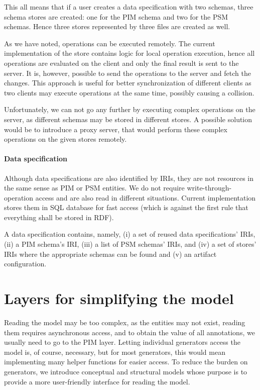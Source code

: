 This all means that if a user creates a data specification with two schemas, three schema stores are created: one for the PIM schema and two for the PSM schemas. Hence three stores represented by three files are created as well.

\medskip

As we have noted, operations can be executed remotely. The current implementation of the store contains logic for local operation execution, hence all operations are evaluated on the client and only the final result is sent to the server. It is, however, possible to send the operations to the server and fetch the changes. This approach is useful for better synchronization of different clients as two clients may execute operations at the same time, possibly causing a collision.

Unfortunately, we can not go any further by executing complex operations on the server, as different schemas may be stored in different stores. A possible solution would be to introduce a proxy server, that would perform these complex operations on the given stores remotely.

\paragraph{Data specification}

Although data specifications are also identified by IRIs, they are not resources in the same sense as PIM or PSM entities. We do not require write-through-operation access and are also read in different situations. Current implementation stores them in SQL database for fast access (which is against the first rule that everything shall be stored in RDF).

A data specification contains, namely, (i) a set of reused data specifications' IRIs, (ii) a PIM schema's IRI, (iii) a list of PSM schemas' IRIs, and (iv) a set of stores' IRIs where the appropriate schemas can be found and (v) an artifact configuration.

\section{Layers for simplifying the model}

Reading the model may be too complex, as the entities may not exist, reading them requires asynchronous access, and to obtain the value of all annotations, we usually need to go to the PIM layer. Letting individual generators access the model is, of course, necessary, but for most generators, this would mean implementing many helper functions for easier access. To reduce the burden on generators, we introduce conceptual and structural models whose purpose is to provide a more user-friendly interface for reading the model.

